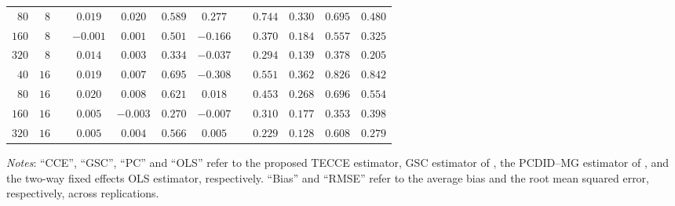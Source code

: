 \documentclass[12pt,fleqn]{article}
\begin{document}
\begin{table}[H]
\begin{tabular}{rrcccccccccc}
   {\small $80$} & {\small $8$} & {\small $$} & {\small $0.019$} & {\small $0.020$} & {\small $0.589$} & {\small $0.277$} & {\small $$} & {\small $0.744$} & {\small $0.330$} & {\small $0.695$} & {\small $0.480$} \\
   {\small $160$} & {\small $8$} & {\small $$} & {\small $-0.001$} & {\small $0.001$} & {\small $0.501$} & {\small $-0.166$} & {\small $$} & {\small $0.370$} & {\small $0.184$} & {\small $0.557$} & {\small $0.325$} \\
   {\small $320$} & {\small $8$} & {\small $$} & {\small $0.014$} & {\small $0.003$} & {\small $0.334$} & {\small $-0.037$} & {\small $$} & {\small $0.294$} & {\small $0.139$} & {\small $0.378$} & {\small $0.205$} \\
   {\small $40$} & {\small $16$} & {\small $$} & {\small $0.019$} & {\small $0.007$} & {\small $0.695$} & {\small $-0.308$} & {\small $$} & {\small $0.551$} & {\small $0.362$} & {\small $0.826$} & {\small $0.842$} \\
   {\small $80$} & {\small $16$} & {\small $$} & {\small $0.020$} & {\small $0.008$} & {\small $0.621$} & {\small $0.018$} & {\small $$} & {\small $0.453$} & {\small $0.268$} & {\small $0.696$} & {\small $0.554$} \\
   {\small $160$} & {\small $16$} & {\small $$} & {\small $0.005$} & {\small $-0.003$} & {\small $0.270$} & {\small $-0.007$} & {\small $$} & {\small $0.310$} & {\small $0.177$} & {\small $0.353$} & {\small $0.398$} \\
   {\small $320$} & {\small $16$} & {\small $$} & {\small $0.005$} & {\small $0.004$} & {\small $0.566$} & {\small $0.005$} & {\small $$} & {\small $0.229$} & {\small $0.128$} & {\small $0.608$} & {\small $0.279$} \\
  \hline\hline
  \end{tabular}
  \par
      \begin{tablenotes}[flushleft]\small
      \item \textit{Notes}: ``CCE'', ``GSC'', ``PC'' and ``OLS'' refer to the proposed TECCE estimator, GSC estimator of \citet{Xu_2017}, the PCDID--MG estimator of \citet{chan2022pcdid}, and the two-way fixed effects OLS estimator, respectively. ``Bias'' and ``RMSE'' refer to the average bias and the root mean squared error, respectively, across replications.
      \end{tablenotes}
  \end{table}
  
  
  
\end{document}
